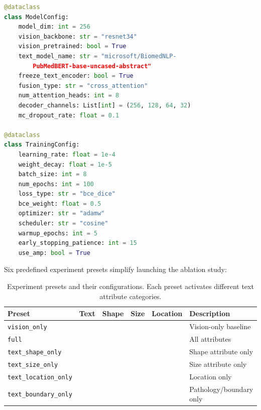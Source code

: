 \begin{lstlisting}[language=Python, caption={Configuration dataclass hierarchy (simplified).}, label={lst:config}]
@dataclass
class ModelConfig:
    model_dim: int = 256
    vision_backbone: str = "resnet34"
    vision_pretrained: bool = True
    text_model_name: str = "microsoft/BiomedNLP-
        PubMedBERT-base-uncased-abstract"
    freeze_text_encoder: bool = True
    fusion_type: str = "cross_attention"  
    num_attention_heads: int = 8
    decoder_channels: List[int] = (256, 128, 64, 32)
    mc_dropout_rate: float = 0.1

@dataclass
class TrainingConfig:
    learning_rate: float = 1e-4
    weight_decay: float = 1e-5
    batch_size: int = 8
    num_epochs: int = 100
    loss_type: str = "bce_dice"
    bce_weight: float = 0.5
    optimizer: str = "adamw"
    scheduler: str = "cosine"
    warmup_epochs: int = 5
    early_stopping_patience: int = 15
    use_amp: bool = True
\end{lstlisting}

Six predefined experiment presets simplify launching the ablation study:

\begin{table}[htbp]
	\caption{Experiment presets and their configurations. Each preset activates different text attribute categories.}
	\label{tab:experiments}
	\centering
	\begin{tabular}{lccccl}
		\toprule
		\textbf{Preset} & \textbf{Text} & \textbf{Shape} & \textbf{Size} & \textbf{Location} & \textbf{Description} \\
		\midrule
		\texttt{vision\_only}      & \textemdash & \textemdash & \textemdash & \textemdash & Vision-only baseline \\
		\texttt{full}              & \checkmark  & \checkmark  & \checkmark  & \checkmark  & All attributes \\
		\texttt{text\_shape\_only} & \checkmark  & \checkmark  & \textemdash & \textemdash & Shape attribute only \\
		\texttt{text\_size\_only}  & \checkmark  & \textemdash & \checkmark  & \textemdash & Size attribute only \\
		\texttt{text\_location\_only} & \checkmark & \textemdash & \textemdash & \checkmark & Location only \\
		\texttt{text\_boundary\_only} & \checkmark & \textemdash & \textemdash & \textemdash & Pathology/boundary only \\
		\bottomrule
	\end{tabular}
\end{table}


